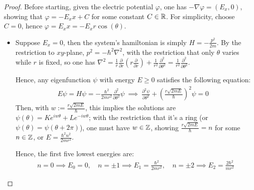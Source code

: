 \documentclass{article}
\begin{document}
\begin{proof}
    Before starting, given the electric potential $\varphi$, one has $-\nabla \varphi = (E_x,0)$, showing that $\varphi = -E_x x+C$ for some constant $C\in\mathbb{R}$. For simplicity, choose $C=0$, hence $\varphi= E_x x = -E_x r\cos(\theta)$.

    \hfil

    \begin{itemize}
        \item[(a)] Suppose $E_x=0$, then the system's hamiltonian is simply $H=-\frac{p^2}{2m}$. By the restriction to $xy$-plane, $p^2=-\hbar^2\nabla^2$, with the restriction that only $\theta$ varies while $r$ is fixed, so one has $\nabla^2 = \frac{1}{r}\frac{\partial}{\partial r}\left(r\frac{\partial}{\partial r}\right)+\frac{1}{r^2}\frac{\partial^2}{\partial \theta^2}=\frac{1}{r^2}\frac{\partial^2}{\partial \theta^2}$.
        
        Hence, any eigenfunction $\psi$ with energy $E\geq 0$ satisfies the following equation:
        \begin{align}
            E\psi = H\psi = -\frac{\hbar^2}{2mr^2}\frac{\partial^2}{\partial\theta^2}\psi\ \implies\ \frac{\partial^2\psi}{\partial \theta^2}+\left(\frac{r\sqrt{2mE}}{\hbar}\right)^2\psi=0
        \end{align}
        Then, with $w := \frac{r\sqrt{2mE}}{\hbar}$, this implies the solutions are $\psi(\theta) = Ke^{iw\theta}+Le^{-iw\theta}$; with the restriction that it's a ring (or $\psi(\theta)=\psi(\theta+2\pi)$), one must have $w\in \mathbb{Z}$, showing $\frac{r\sqrt{2mE}}{\hbar}=n$ for some $n\in\mathbb{Z}$, or $E = \frac{\hbar^2n^2}{2mr^2}$.

        Hence, the first five lowest energies are:
        \begin{align}
            &n=0\implies E_0 = 0,\quad n=\pm 1\implies E_1=\frac{\hbar^2}{2mr^2},\quad n=\pm 2\implies E_2=\frac{2\hbar^2}{mr^2}
        \end{align}

        \hfil


\end{itemize}
\end{proof}
\end{document}
